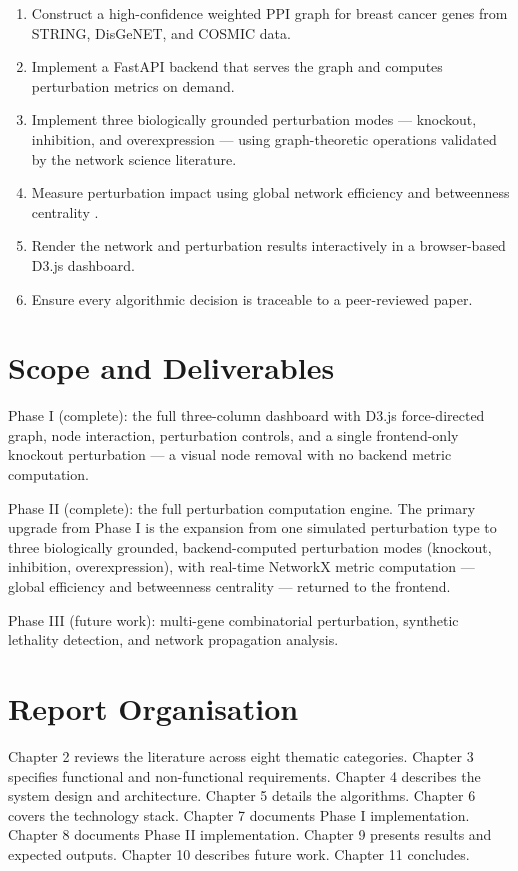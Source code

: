 \documentclass[12pt,a4paper]{report}
\begin{document}
\begin{enumerate}[leftmargin=*, label=\arabic*.]
  \item Construct a high-confidence weighted PPI graph for breast cancer genes from STRING, DisGeNET, and COSMIC data.
  \item Implement a FastAPI backend that serves the graph and computes perturbation metrics on demand.
  \item Implement three biologically grounded perturbation modes — knockout, inhibition, and overexpression — using graph-theoretic operations validated by the network science literature.
  \item Measure perturbation impact using global network efficiency \citep{latora2001efficient} and betweenness centrality \citep{freeman1977set}.
  \item Render the network and perturbation results interactively in a browser-based D3.js dashboard.
  \item Ensure every algorithmic decision is traceable to a peer-reviewed paper.
\end{enumerate}

\section{Scope and Deliverables}

Phase I (complete): the full three-column dashboard with D3.js force-directed graph, node interaction, perturbation controls, and a single frontend-only knockout perturbation — a visual node removal with no backend metric computation.

Phase II (complete): the full perturbation computation engine. The primary upgrade from Phase I is the expansion from one simulated perturbation type to three biologically grounded, backend-computed perturbation modes (knockout, inhibition, overexpression), with real-time NetworkX metric computation — global efficiency and betweenness centrality — returned to the frontend.

Phase III (future work): multi-gene combinatorial perturbation, synthetic lethality detection, and network propagation analysis.

\section{Report Organisation}

Chapter 2 reviews the literature across eight thematic categories. Chapter 3 specifies functional and non-functional requirements. Chapter 4 describes the system design and architecture. Chapter 5 details the algorithms. Chapter 6 covers the technology stack. Chapter 7 documents Phase I implementation. Chapter 8 documents Phase II implementation. Chapter 9 presents results and expected outputs. Chapter 10 describes future work. Chapter 11 concludes.
\end{document}
